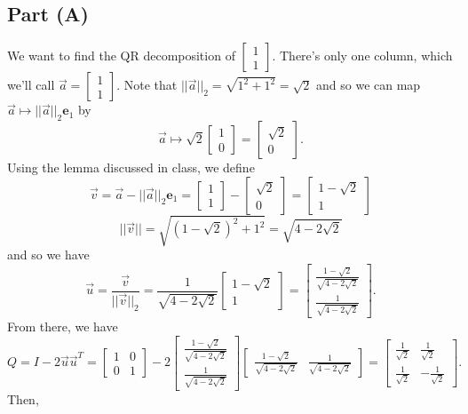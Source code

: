 \documentclass[letterpaper]{article}
\newcommand{\0}{\mathbf{0}}
\newcommand{\e}{\mathbf{e}}
\begin{document}
\subsection*{Part (A)}
We want to find the QR decomposition of $\begin{bmatrix}
    1 \\ 1
\end{bmatrix}$. There's only one column, which we'll call $\vec{a} = \begin{bmatrix}
    1 \\ 1
\end{bmatrix}$. Note that $||\vec{a}||_2 = \sqrt{1^2 + 1^2} = \sqrt{2}$ and so we can map $\vec{a} \mapsto ||\vec{a}||_2 \e_1$ by 
\[\vec{a} \mapsto \sqrt{2} \begin{bmatrix}
    1 \\ 0
\end{bmatrix} = \begin{bmatrix}
    \sqrt{2} \\ 0
\end{bmatrix}.\]
Using the lemma discussed in class, we define 
\[\vec{v} = \vec{a} - ||\vec{a}||_2 \e_1 = \begin{bmatrix}
    1 \\ 1
\end{bmatrix} - \begin{bmatrix}
    \sqrt{2} \\ 0
\end{bmatrix} = \begin{bmatrix}
    1 - \sqrt{2} \\ 1
\end{bmatrix}\] \[||\vec{v}|| = \sqrt{(1 - \sqrt{2})^2 + 1^2} = \sqrt{4 - 2\sqrt{2}}\] and so we have 
\[\vec{u} = \frac{\vec{v}}{||\vec{v}||_2} = \frac{1}{\sqrt{4 - 2\sqrt{2}}} \begin{bmatrix}
    1 - \sqrt{2} \\ 1
\end{bmatrix} = \begin{bmatrix}
    \frac{1-\sqrt{2}}{\sqrt{4-2\sqrt{2}}}\\ 
    \frac{1}{\sqrt{4-2\sqrt{2}}}
\end{bmatrix}.\] From there, we have 
\[Q = I - 2\vec{u}\vec{u}^T = \begin{bmatrix}
    1 & 0 \\ 0 & 1
\end{bmatrix} - 2 \begin{bmatrix}
    \frac{1-\sqrt{2}}{\sqrt{4-2\sqrt{2}}}\\ 
    \frac{1}{\sqrt{4-2\sqrt{2}}}
\end{bmatrix} \begin{bmatrix}
    \frac{1-\sqrt{2}}{\sqrt{4-2\sqrt{2}}} & 
    \frac{1}{\sqrt{4-2\sqrt{2}}}
\end{bmatrix} = \begin{bmatrix}
    \frac{1}{\sqrt{2}} & \frac{1}{\sqrt{2}} \\ 
    \frac{1}{\sqrt{2}} & -\frac{1}{\sqrt{2}}
\end{bmatrix}.\] Then, 
\end{document}
